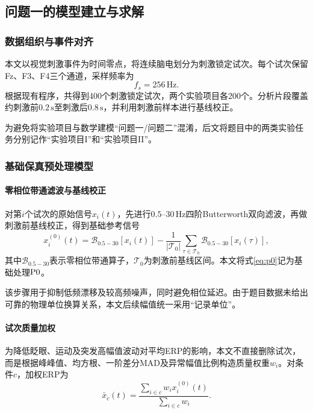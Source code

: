 \subsection{问题一的模型建立与求解}

\subsubsection{数据组织与事件对齐}

本文以视觉刺激事件为时间零点，将连续脑电划分为刺激锁定试次。每个试次保留Fz、F3、F4三个通道，采样频率为
\[
f_s=256\,\mathrm{Hz}.
\]
根据现有程序，共得到400个刺激锁定试次，两个实验项目各200个。分析片段覆盖约刺激前$0.2\,\mathrm{s}$至刺激后$0.8\,\mathrm{s}$，并利用刺激前样本进行基线校正。

为避免将实验项目与数学建模“问题一/问题二”混淆，后文将题目中的两类实验任务分别记作“实验项目I”和“实验项目II”。

\subsubsection{基础保真预处理模型}

\paragraph{零相位带通滤波与基线校正}

对第$i$个试次的原始信号$x_i(t)$，先进行$0.5$--$30\,\mathrm{Hz}$四阶Butterworth双向滤波，再做刺激前基线校正，得到基础参考信号
\begin{equation}
x_i^{(0)}(t)
=
\mathcal{B}_{0.5-30}[x_i(t)]
-
\frac{1}{|\mathcal T_0|}
\sum_{\tau\in\mathcal T_0}
\mathcal{B}_{0.5-30}[x_i(\tau)],
\label{eq:p0}
\end{equation}
其中$\mathcal{B}_{0.5-30}$表示零相位带通算子，$\mathcal T_0$为刺激前基线区间。本文将式\eqref{eq:p0}记为基础处理$\mathrm{P0}$。

该步骤用于抑制低频漂移及较高频噪声，同时避免相位延迟。由于题目数据未给出可靠的物理单位换算关系，本文后续幅值统一采用“记录单位”。

\paragraph{试次质量加权}

为降低眨眼、运动及突发高幅值波动对平均ERP的影响，本文不直接删除试次，而是根据峰峰值、均方根、一阶差分MAD及异常幅值比例构造质量权重$w_i$。对条件$c$，加权ERP为
\begin{equation}
\bar{x}_c(t)
=
\frac{\sum_{i\in c} w_i x_i^{(0)}(t)}
{\sum_{i\in c} w_i}.
\label{eq:weighted_erp}
\end{equation}

